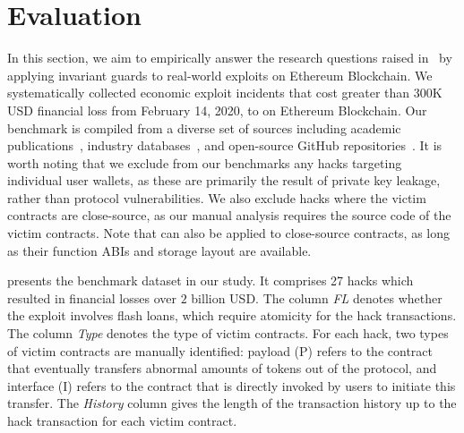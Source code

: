 \vspace{-2ex}
\section{Evaluation}
\label{sec:evaluation}
In this section, we aim to empirically answer the research questions raised in~ 
by applying invariant guards to real-world exploits on Ethereum Blockchain. 
We systematically collected economic exploit incidents that cost greater than 
300K USD financial loss from February 14, 2020, to  on Ethereum Blockchain.
Our benchmark is compiled from a diverse set of sources including academic
publications~\cite{chen2022flashsyn, qin2021attacking}, industry databases~\cite{Hacked,
BlockSecMedium}, and open-source GitHub repositories~\cite{DeFiHackLabs,LearnEVMHacks}. It is worth
noting that we exclude from our benchmarks any hacks targeting individual user wallets, as these
are primarily the result of private key leakage, rather than protocol vulnerabilities. We also
exclude hacks where the victim contracts are close-source, as our manual analysis requires the
source code of the victim contracts.
Note that \name can also be applied to close-source contracts, as long as their function ABIs and
storage layout are available.



 presents the benchmark dataset in our study. It comprises 27 hacks which resulted in financial losses over $2$ billion USD. The column \emph{FL} denotes whether the exploit involves flash loans, which require atomicity for the hack transactions. The column \emph{Type} denotes the type of victim contracts.
For each hack, two types of victim contracts are manually identified: payload (P) refers to the
 contract that eventually transfers abnormal amounts of tokens out of the protocol, and
interface (I) refers to the contract that is directly invoked by users to initiate this 
transfer. The \emph{History} column gives the length of the transaction history up to the
hack transaction for each victim contract.



